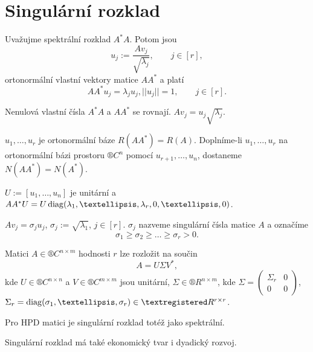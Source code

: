 \documentclass[12pt]{article}					%
\begin{document}
\section{Singulární rozklad}
\begin{veta}
	Uvažujme spektrální rozklad $A^*A$. Potom jsou
	$$ u_j := \frac{Av_j}{\sqrt{\lambda_j}}, \qquad j \in [r], $$
	ortonormální vlastní vektory matice $A A^*$ a platí
	$$ A A^* u_j = \lambda_j u_j, ||u_j|| = 1, \qquad j \in [r]. $$
\end{veta}

\begin{dusledek}
	Nenulová vlastní čísla $A^*A$ a $A A^*$ se rovnají. $Av_j = u_j\sqrt{\lambda_j}$.

	$u_1, …, u_r$ je ortonormální báze $R(A A^*) = R(A)$. Doplníme-li $u_1, …, u_r$ na ortonormální bázi prostoru $®C^n$ pomocí $u_{r+1}, …, u_n$, dostaneme $N(A A^*) = N(A^*)$.

	$U := [u_1, …, u_n]$ je unitární a $A A^* U = U\diag(\lambda_1, …, \lambda_r, 0, …, 0)$.
\end{dusledek}

\begin{definice}
	$A v_j = \sigma_j u_j$, $\sigma_j := \sqrt{\lambda_1}$, $j \in [r]$. $\sigma_j$ nazveme singulární čísla matice $A$ a označíme
	$$ \sigma_1 ≥ \sigma_2 ≥ … ≥ \sigma_r > 0. $$
\end{definice}

\begin{veta}
	Matici $A \in ®C^{n \times m}$ hodnosti $r$ lze rozložit na součin
	$$ A = U \Sigma V^*, $$
	kde $U \in ®C^{n \times n}$ a $V \in ®C^{m \times m}$ jsou unitární, $\Sigma \in ®R^{n \times m}$, kde $\Sigma = \begin{pmatrix} \Sigma_r & 0 \\ 0 & 0 \end{pmatrix}$, $\Sigma_r = \diag(\sigma_1, …, \sigma_r) \in ®R^{r \times r}$.
\end{veta}

\begin{tvrzeni}
	Pro HPD matici je singulární rozklad totéž jako spektrální.
\end{tvrzeni}


\begin{poznamka}
	Singulární rozklad má také ekonomický tvar i dyadický rozvoj.
\end{poznamka}
\end{document}
